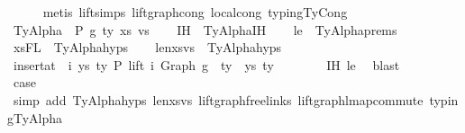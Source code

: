 \begin{isabellebody}
\ \ \ \ \isamarkupfalse%
\ {\isacharparenleft}{\kern0pt}metis\ lift{\isachardot}{\kern0pt}simps{\isacharparenleft}{\kern0pt}{}{\isacharparenright}{\kern0pt}\ lift{\isacharunderscore}{\kern0pt}graph{\isacharunderscore}{\kern0pt}cong\ local{\isachardot}{\kern0pt}cong\ typing{\isachardot}{\kern0pt}TyCong{\isacharparenright}{\kern0pt}\isanewline
\isanewline
{}\isamarkupfalse%
\isanewline
\ \ \isamarkupfalse%
\ {\isacharparenleft}{\kern0pt}TyAlpha\ {\isasymGamma}{}\ P\ g\ ty\ xs\ vs{\isacharparenright}{\kern0pt}\isanewline
\ \ \isamarkupfalse%
\ IH\ {\isacharequal}{\kern0pt}\ TyAlpha{\isachardot}{\kern0pt}IH\isanewline
\ \ \isamarkupfalse%
\ le\ {\isacharequal}{\kern0pt}\ TyAlpha{\isachardot}{\kern0pt}prems{\isacharparenleft}{\kern0pt}{}{\isacharparenright}{\kern0pt}\isanewline
\ \ \isamarkupfalse%
\ xs{\isacharunderscore}{\kern0pt}FL\ {\isacharequal}{\kern0pt}\ TyAlpha{\isachardot}{\kern0pt}hyps{\isacharparenleft}{\kern0pt}{}{\isacharparenright}{\kern0pt}\isanewline
\ \ \isamarkupfalse%
\ len{\isacharunderscore}{\kern0pt}xs{\isacharunderscore}{\kern0pt}vs\ {\isacharequal}{\kern0pt}\ TyAlpha{\isachardot}{\kern0pt}hyps{\isacharparenleft}{\kern0pt}{}{\isacharparenright}{\kern0pt}\isanewline
\isanewline
\ \ \isamarkupfalse%
\ {\isachardoublequoteopen}insert{\isacharunderscore}{\kern0pt}at\ {\isasymGamma}{}\ i\ {\isacharparenleft}{\kern0pt}ys{\isacharcomma}{\kern0pt}\ ty{}{\isacharprime}{\kern0pt}{\isacharparenright}{\kern0pt}\ {\isasymturnstile}{\isacharbraceleft}{\kern0pt}P{\isacharbraceright}{\kern0pt}\ lift\ i\ {\isacharparenleft}{\kern0pt}Graph\ g{\isacharparenright}{\kern0pt}\ {\isacharcolon}{\kern0pt}\ ty{\isachardoublequoteclose}\ \ ys\ ty{}{\isacharprime}{\kern0pt}\isanewline
\ \ \ \ \ \ \isamarkupfalse%
\ IH\ le\ \isamarkupfalse%
\ blast\isanewline
\isanewline
\ \ \isanewline
\isanewline
\ \ \isamarkupfalse%
\ \isamarkupfalse%
\ {\isacharquery}{\kern0pt}case\isanewline
\ \ \ \ \isamarkupfalse%
\ {\isacharparenleft}{\kern0pt}simp\ add{\isacharcolon}{\kern0pt}\ TyAlpha{\isachardot}{\kern0pt}hyps{\isacharparenleft}{\kern0pt}{}{\isacharcomma}{\kern0pt}{}{\isacharparenright}{\kern0pt}\ len{\isacharunderscore}{\kern0pt}xs{\isacharunderscore}{\kern0pt}vs\ lift{\isacharunderscore}{\kern0pt}graph{\isacharunderscore}{\kern0pt}freelinks\ lift{\isacharunderscore}{\kern0pt}graph{\isacharunderscore}{\kern0pt}lmap{\isacharunderscore}{\kern0pt}commute\ typing{\isachardot}{\kern0pt}TyAlpha\isanewline

\end{isabellebody}
